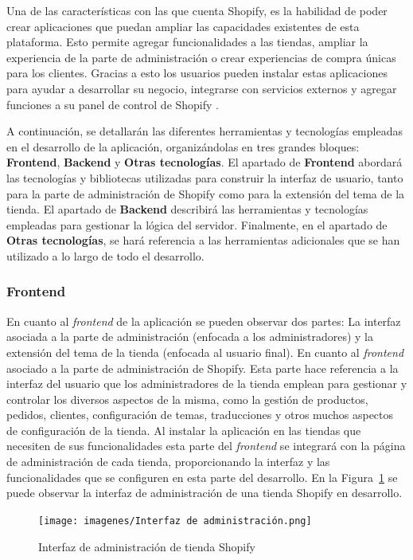 \documentclass[12pt]{article}
\begin{document}
Una de las características con las que cuenta Shopify, es la habilidad de poder crear aplicaciones que puedan ampliar las capacidades existentes 
de esta plataforma. Esto permite agregar funcionalidades a las tiendas, ampliar la experiencia de la parte de administración
o crear experiencias de compra únicas para los clientes. Gracias a esto los usuarios pueden instalar estas aplicaciones para ayudar a desarrollar
su negocio, integrarse con servicios externos y agregar funciones a su panel de control de Shopify \cite{shopify-dev}.

A continuación, se detallarán las diferentes herramientas y tecnologías empleadas en el desarrollo de la aplicación, organizándolas en tres grandes
bloques: \textbf{Frontend}, \textbf{Backend} y \textbf{Otras tecnologías}. El apartado de \textbf{Frontend} abordará las tecnologías y 
bibliotecas utilizadas para construir la interfaz de usuario, tanto para la parte de administración de Shopify como para la extensión del 
tema de la tienda. El apartado de \textbf{Backend} describirá las herramientas y tecnologías empleadas para gestionar la lógica del servidor. 
Finalmente, en el apartado de \textbf{Otras tecnologías}, se hará referencia a las herramientas adicionales que se han utilizado 
a lo largo de todo el desarrollo.

\subsubsection{Frontend}
En cuanto al \textit{frontend} de la aplicación se pueden observar dos partes: La interfaz asociada a la parte de administración (enfocada a los administradores) 
y la extensión del tema de la tienda (enfocada al usuario final). 
En cuanto al \textit{frontend} asociado a la parte de administración de Shopify. 
Esta parte hace referencia a la interfaz del usuario que los administradores de la tienda emplean para gestionar y controlar los diversos aspectos de
la misma, como la gestión de productos, pedidos, clientes, configuración de temas, traducciones y otros muchos aspectos de configuración de la tienda.
Al instalar la aplicación en las tiendas que necesiten de sus funcionalidades esta parte del \textit{frontend} se integrará con la página de administración de 
cada tienda, proporcionando la interfaz y las funcionalidades que se configuren en esta parte del desarrollo. En la Figura~\ref{fig:1} se puede observar la 
interfaz de administración de una tienda Shopify en desarrollo.

\begin{figure}[ht]
    \centering
    \texttt{[image: imagenes/Interfaz de administración.png]}
    \caption{\label{fig:1}Interfaz de administración de tienda Shopify}
    \vspace{\fill}
\end{figure}
\end{document}
